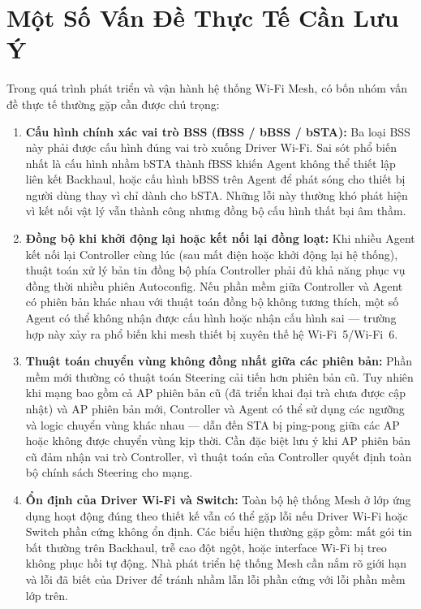 \section{Một Số Vấn Đề Thực Tế Cần Lưu Ý}

Trong quá trình phát triển và vận hành hệ thống Wi-Fi Mesh, có bốn nhóm vấn đề thực
tế thường gặp cần được chú trọng:

\begin{enumerate}
	\item \textbf{Cấu hình chính xác vai trò BSS (fBSS / bBSS / bSTA):}
	Ba loại BSS này phải được cấu hình đúng vai trò xuống Driver Wi-Fi. Sai sót
	phổ biến nhất là cấu hình nhầm bSTA thành fBSS khiến Agent không thể thiết
	lập liên kết Backhaul, hoặc cấu hình bBSS trên Agent để phát sóng cho thiết
	bị người dùng thay vì chỉ dành cho bSTA. Những lỗi này thường khó phát hiện
	vì kết nối vật lý vẫn thành công nhưng đồng bộ cấu hình thất bại âm thầm.
	
	\item \textbf{Đồng bộ khi khởi động lại hoặc kết nối lại đồng loạt:}
	Khi nhiều Agent kết nối lại Controller cùng lúc (sau mất điện hoặc khởi động
	lại hệ thống), thuật toán xử lý bản tin đồng bộ phía Controller phải đủ khả
	năng phục vụ đồng thời nhiều phiên Autoconfig. Nếu phần mềm giữa Controller
	và Agent có phiên bản khác nhau với thuật toán đồng bộ không tương thích,
	một số Agent có thể không nhận được cấu hình hoặc nhận cấu hình sai ---
	trường hợp này xảy ra phổ biến khi mesh thiết bị xuyên thế hệ Wi-Fi~5/Wi-Fi~6.
	
	\item \textbf{Thuật toán chuyển vùng không đồng nhất giữa các phiên bản:}
	Phần mềm mới thường có thuật toán Steering cải tiến hơn phiên bản cũ. Tuy
	nhiên khi mạng bao gồm cả AP phiên bản cũ (đã triển khai đại trà chưa được
	cập nhật) và AP phiên bản mới, Controller và Agent có thể sử dụng các ngưỡng
	và logic chuyển vùng khác nhau --- dẫn đến STA bị ping-pong giữa các AP hoặc
	không được chuyển vùng kịp thời. Cần đặc biệt lưu ý khi AP phiên bản cũ
	đảm nhận vai trò Controller, vì thuật toán của Controller quyết định toàn bộ
	chính sách Steering cho mạng.
	
	\item \textbf{Ổn định của Driver Wi-Fi và Switch:}
	Toàn bộ hệ thống Mesh ở lớp ứng dụng hoạt động đúng theo thiết kế vẫn có
	thể gặp lỗi nếu Driver Wi-Fi hoặc Switch phần cứng không ổn định. Các biểu
	hiện thường gặp gồm: mất gói tin bất thường trên Backhaul, trễ cao đột ngột,
	hoặc interface Wi-Fi bị treo không phục hồi tự động. Nhà phát triển hệ thống
	Mesh cần nắm rõ giới hạn và lỗi đã biết của Driver để tránh nhầm lẫn lỗi
	phần cứng với lỗi phần mềm lớp trên.
\end{enumerate}